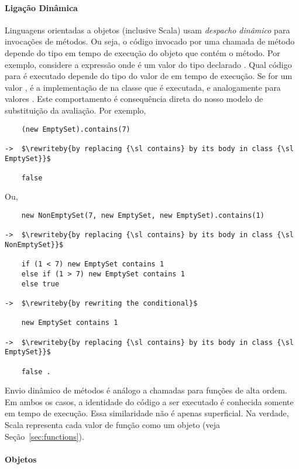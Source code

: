 \paragraph{Liga\c{c}\~{a}o Din\^{a}mica}
Linguagens orientadas a objetos (inclusive Scala) usam \emph{despacho din\^{a}mico} para 
invoca\c{c}\~{o}es de m\'{e}todos. Ou seja, o c\'{o}digo invocado por uma chamada de m\'{e}todo depende
do tipo em tempo de execu\c{c}\~{a}o do objeto que cont\'{e}m o m\'{e}todo. Por exemplo, considere
a express\~{a}o  onde  \'{e} um valor do tipo declarado . 
Qual c\'{o}digo para  \'{e} executado depende do tipo do valor de  em 
tempo de execu\c{c}\~{a}o. Se for um valor , \'{e} a implementa\c{c}\~{a}o de  na 
classe  que \'{e} executada, e analogamente para valores .
Este comportamento \'{e} consequ\^{e}ncia direta do nosso modelo de substitui\c{c}\~{a}o da avalia\c{c}\~{a}o.
Por exemplo, 
\begin{lstlisting}
    (new EmptySet).contains(7) 

->  $\rewriteby{by replacing {\sl contains} by its body in class {\sl EmptySet}}$

    false
\end{lstlisting}
Ou,
\begin{lstlisting}
    new NonEmptySet(7, new EmptySet, new EmptySet).contains(1)

->  $\rewriteby{by replacing {\sl contains} by its body in class {\sl NonEmptySet}}$

    if (1 < 7) new EmptySet contains 1
    else if (1 > 7) new EmptySet contains 1
    else true

->  $\rewriteby{by rewriting the conditional}$

    new EmptySet contains 1

->  $\rewriteby{by replacing {\sl contains} by its body in class {\sl EmptySet}}$

    false .
\end{lstlisting}

Envio din\^{a}mico de m\'{e}todos \'{e} an\'{a}logo a chamadas para fun\c{c}\~{o}es de alta ordem. 
Em ambos os casos, a identidade do c\'{o}digo  a ser executado \'{e} conhecida somente
em tempo de execu\c{c}\~{a}o. Essa similaridade n\~{a}o \'{e} apenas superficial. Na verdade, 
Scala representa cada valor de fun\c{c}\~{a}o como um objeto (veja Se\c{c}\~{a}o~\ref{sec:functions}).

\paragraph{Objetos}

